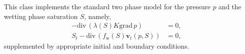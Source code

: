 This class implements the standard two phase model for the pressure $p$ and the wetting phase saturation $S$, namely, \begin{align*} - \text{div}\, (\lambda (S) K \text{grad}\, p ) &= 0, \\ S_t - \text{div}\, (f_\text{w}(S) \boldsymbol{v}_t(p, S)) &= 0, \end{align*} supplemented by appropriate initial and boundary conditions. 
